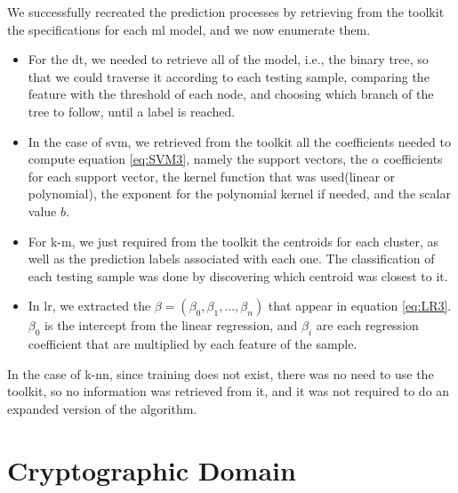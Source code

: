 We successfully recreated the prediction processes by retrieving from the toolkit the specifications for each \ac{ml} model, and we now enumerate them.

\begin{itemize}
	
    \item For the \ac{dt}, we needed to retrieve all of the model, i.e., the binary tree, so that we could traverse it according to each testing sample, comparing the feature with the threshold of each node, and choosing which branch of the tree to follow, until a label is reached. 

    \item In the case of \ac{svm}, we retrieved from the toolkit all the coefficients needed to compute equation \ref{eq:SVM3}, namely the support vectors, the $\alpha$ coefficients for each support vector, the kernel function that was used(linear or polynomial), the exponent for the polynomial kernel if needed, and the scalar value $b$.

    \item For \ac{k-m}, we just required from the toolkit the centroids for each cluster, as well as the prediction labels associated with each one. The classification of each testing sample was done by discovering which centroid was closest to it.

    \item In \ac{lr}, we extracted the $\beta=(\beta_0,\beta_1,...,\beta_n)$ that appear in equation \ref{eq:LR3}. $\beta_0$ is the intercept from the linear regression, and $\beta_i$ are each regression coefficient that are multiplied by each feature of the sample.

\end{itemize}

In the case of \ac{k-nn}, since training does not exist, there was no need to use the toolkit, so no information was retrieved from it, and it was not required to do an expanded version of the algorithm.



\section{Cryptographic Domain}
\label{sec:CryptoDomainImplementation}


